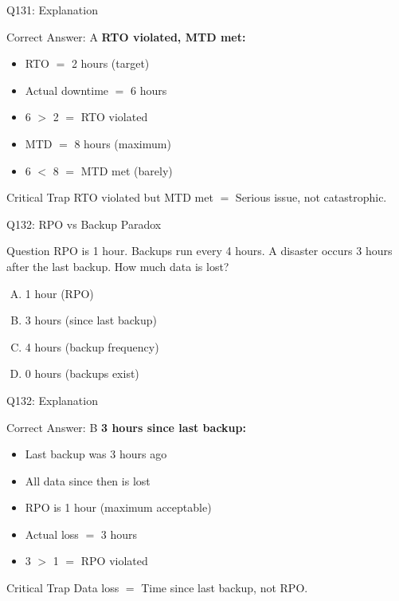 \documentclass{beamer}
\begin{document}
	\begin{frame}{Q131: Explanation}
		\begin{block}{Correct Answer: A}
			\textbf{RTO violated, MTD met:}
			\begin{itemize}
				\item RTO $=$ 2 hours (target)
				\item Actual downtime $=$ 6 hours
				\item 6 $>$ 2 $=$ RTO violated
				\item MTD $=$ 8 hours (maximum)
				\item 6 $<$ 8 $=$ MTD met (barely)
			\end{itemize}
		\end{block}
		\begin{alertblock}{Critical Trap}
			RTO violated but MTD met $=$ Serious issue, not catastrophic.
		\end{alertblock}
	\end{frame}
	
	\begin{frame}{Q132: RPO vs Backup Paradox}
		\begin{block}{Question}
			RPO is 1 hour. Backups run every 4 hours. A disaster occurs 3 hours after the last backup. How much data is lost?
		\end{block}
		\begin{enumerate}[(A)]
			\item 1 hour (RPO)
			\item 3 hours (since last backup)
			\item 4 hours (backup frequency)
			\item 0 hours (backups exist)
		\end{enumerate}
	\end{frame}
	
	\begin{frame}{Q132: Explanation}
		\begin{block}{Correct Answer: B}
			\textbf{3 hours since last backup:}
			\begin{itemize}
				\item Last backup was 3 hours ago
				\item All data since then is lost
				\item RPO is 1 hour (maximum acceptable)
				\item Actual loss $=$ 3 hours
				\item 3 $>$ 1 $=$ RPO violated
			\end{itemize}
		\end{block}
		\begin{alertblock}{Critical Trap}
			Data loss $=$ Time since last backup, not RPO.
		\end{alertblock}
	\end{frame}
	
\end{document}
